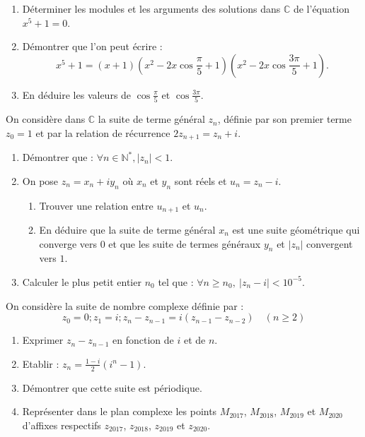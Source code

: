 %
\begin{exo}
      \begin{enumerate}
            \item D\'eterminer les modules et les arguments des solutions dans $\mathbb{C}$ de l'\'equation $x^5+1=0$.
            \item D\'emontrer que l'on peut \'ecrire : 
                  \[
                  x^5+1= (x+1) \left( x^2-2x\cos \frac{\pi}{5} +1 \right) \left( x^2 - 2x\cos \frac{3\pi}{5} +1 \right) .
                  \]
            \item En d\'eduire les valeurs de $\cos \frac{\pi}{5}$ et $\cos \frac{3\pi}{5}$.
      \end{enumerate}
\end{exo}
%
\begin{exo}
      On consid\`ere dans $\mathbb{C}$ la suite de terme g\'en\'eral $z_n$, 
      d\'efinie par son premier terme $z_0 = 1$ et par la relation de r\'ecurrence $2z_{n+1} = z_n + i$.
      \begin{enumerate}
            \item D\'emontrer que : $\forall n \in\mathbb{N}^*, |z_n|<1$.
            \item On pose $z_n = x_n + i y_n$ o\`u $x_n$ et $y_n$ sont r\'eels et $u_n = z_n - i$.
                  \begin{enumerate}
                        \item Trouver une relation entre $u_{n+1}$ et $u_n$.
                        \item En d\'eduire que la suite de terme g\'en\'eral 
                              $x_n$ est une suite g\'eom\'etrique qui converge vers $0$ 
                              et que les suite de termes g\'en\'eraux $y_n$ et $|z_n|$ convergent vers $1$.                  
                  \end{enumerate}
            \item Calculer le plus petit entier $n_0$ tel que : $\forall n \geq n_0,\ |z_n - i| < 10^{-5}$.
      \end{enumerate}
\end{exo}
%
\begin{exo}
      On consid\`ere la suite de nombre complexe d\'efinie par : 
            \[
                  z_0 = 0 ; z_1 = i ; z_n - z_{n-1} = i (z_{n-1} - z_{n-2} ) \quad (n\geq 2)
            \]
      \begin{enumerate}
            \item Exprimer $z_n - z_{n-1}$ en fonction de $i$ et de $n$.
            \item Etablir : $z_n = \frac{1-i}{2} (i^n - 1)$.
            \item D\'emontrer que cette suite est p\'eriodique.
            \item Repr\'esenter dans le plan complexe les points $M_{2017}$, $M_{2018}$, $M_{2019}$ et $M_{2020}$ 
                  d'affixes respectifs  $z_{2017}$, $z_{2018}$, $z_{2019}$ et $z_{2020}$.
      \end{enumerate}
\end{exo}
